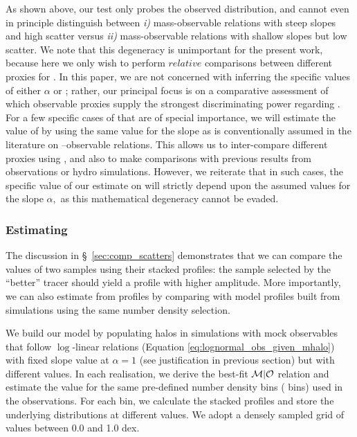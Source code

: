 \documentclass[fleqn,usenatbib,useAMS]{mnras}
\begin{document}
    As shown above, our \topn{} test only probes the observed \mvir{} distribution, and cannot even
    in principle distinguish between {\em i)} mass-observable relations with steep slopes and high
    scatter versus {\em ii)} mass-observable relations with shallow slopes but low scatter. 
    We note that this degeneracy is unimportant for the present work, because here we only wish to
    perform $relative$ comparisons between different proxies for \mvir{}. 
    In this paper, we are not concerned with inferring the specific values of either $\alpha$ or 
    \scatterObsSymMhalo{}; rather, our principal focus is on a comparative assessment of which
    observable proxies \obsSym{} supply the strongest discriminating power regarding \mvir{}. 
    For a few specific cases of \obsSym{} that are of special importance, we will estimate the value
    of \scatterObsSymMhalo{} by using the same value for the slope as is conventionally assumed in
    the literature on \mvir{}--observable relations.
    This allows us to inter-compare different proxies using \scatterObsSymMhalo{}, and also to make
    comparisons with previous results from observations or hydro simulations. 
    However, we reiterate that in such cases, the specific value of our estimate on
    \scatterObsSymMhalo{} will strictly depend upon the assumed values for the slope $\alpha,$ as
    this mathematical degeneracy cannot be evaded.

\subsubsection{Estimating \scatterMhaloObsSym{}}
    \label{sec:estimate_scatter}

    The discussion in \S\ \ref{sec:comp_scatters} demonstrates that we can compare the
    \scatterMhaloObsSym{} values of two \topn{} samples using their stacked \dsigma{} profiles:
    the sample selected by the ``better'' \mhalo{} tracer should yield a \dsigma{} profile with
    higher amplitude.
    More importantly, we can also estimate \scatterMhaloObsSym{} from \dsigma{} profiles by
    comparing with model profiles built from simulations using the same number density selection.

    We build our model by populating halos in simulations with mock observables that follow
    $\log$-linear relations (Equation \ref{eq:lognormal_obs_given_mhalo}) with fixed slope value at
    $\alpha = 1$ (see justification in previous section) but with different \scatterObsSymMhalo{}
    values.
    In each realisation, we derive the best-fit ${\mathcal{M}}| {\mathcal{O}}$ relation and estimate the
    \scatterMhaloObsSym{} value for the same pre-defined number density bins (\topn{} bins) used in
    the observations.
    For each \topn{} bin, we calculate the stacked \dsigma{} profiles and store the underlying
    \mhalo{} distributions at different \scatterMhaloObsSym{} values. 
    We adopt a densely sampled grid of \scatterMhaloObsSym{} values between 0.0 and 1.0 dex.
\end{document}
